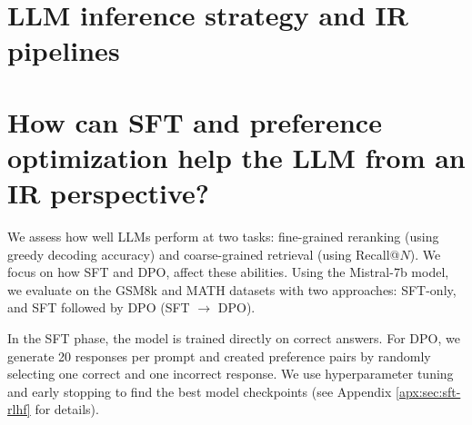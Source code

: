 
\newpage
\appendix


\section{LLM inference strategy and IR pipelines}

\begin{table}[h]
\caption{Correspondence between LLM inference and IR pipelines.}
  \label{tb:llm-retriever-reranker}
  \centering
\end{table}


\section{How can SFT and preference optimization help the LLM from an IR perspective?}\label{apx:sft-rlhf-empirical}


We assess how well LLMs perform at two tasks: fine-grained reranking (using greedy decoding accuracy) and coarse-grained retrieval (using Recall@$N$).  
We focus on how SFT and DPO, affect these abilities.  
Using the Mistral-7b model, we evaluate on the GSM8k and MATH datasets with two approaches: SFT-only, and SFT followed by DPO (SFT $\rightarrow$ DPO).

In the SFT phase, the model is trained directly on correct answers. 
For DPO, we generate 20 responses per prompt and created preference pairs by randomly selecting one correct and one incorrect response.  
We use hyperparameter tuning and early stopping to find the best model checkpoints (see Appendix \ref{apx:sec:sft-rlhf} for details).


